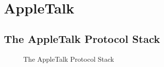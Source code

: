 \chapter{AppleTalk}

\section{The AppleTalk Protocol Stack}

\begin{figure}
\caption{The AppleTalk Protocol Stack}
\label{appletalk:stack}
\end{figure}
